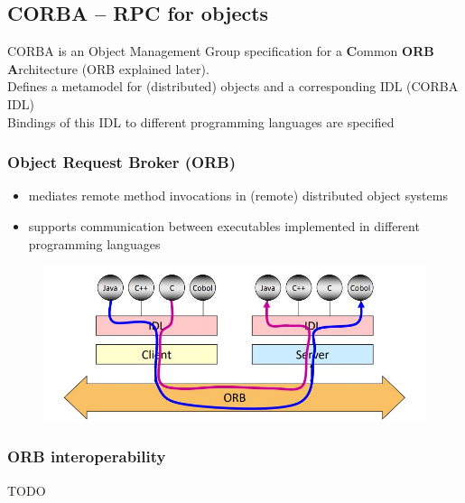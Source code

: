		\subsection{CORBA -- RPC for objects}
			CORBA is an Object Management Group specification for a	\textbf{C}ommon \textbf{ORB} \textbf{A}rchitecture (ORB explained later).\\
			Defines a metamodel for (distributed) objects and a corresponding IDL (CORBA IDL)\\
			Bindings of this IDL to different programming languages are	specified
			
			\subsubsection{Object Request Broker (ORB)}
			\begin{itemize}
				\item mediates remote method invocations in (remote) distributed object systems
				\item supports communication between executables implemented in different programming languages
			\end{itemize}
			\begin{figure}[h!]
				\includegraphics[scale=0.7]{res/orb.jpg}
			\end{figure}
			
			
			\subsubsection{ORB interoperability}
			TODO
			
			
			
			
			
			
			
			
			
			
			
			